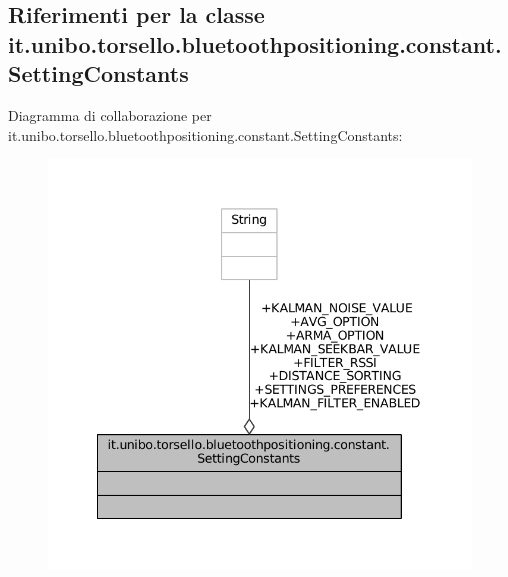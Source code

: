 \hypertarget{classit_1_1unibo_1_1torsello_1_1bluetoothpositioning_1_1constant_1_1SettingConstants}{}\subsection{Riferimenti per la classe it.\+unibo.\+torsello.\+bluetoothpositioning.\+constant.\+Setting\+Constants}
\label{classit_1_1unibo_1_1torsello_1_1bluetoothpositioning_1_1constant_1_1SettingConstants}


Diagramma di collaborazione per it.\+unibo.\+torsello.\+bluetoothpositioning.\+constant.\+Setting\+Constants\+:
\nopagebreak
\begin{figure}[H]
\begin{center}
\leavevmode
\includegraphics[width=342pt]{classit_1_1unibo_1_1torsello_1_1bluetoothpositioning_1_1constant_1_1SettingConstants__coll__graph}
\end{center}
\end{figure}
